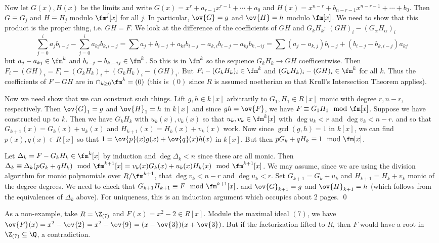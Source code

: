 Now let $G(x),H(x)$ be the limits and write $G(x)=x^r+a_{r-1}x^{r-1}+\cdots+a_0$ and $H(x)=x^{n-r}+b_{n-r-1}x^{n-r-1}+\cdots+b_0$. Then $G \equiv G_j$ and $H \equiv H_j$ modulo $\fm^j[x]$ for all $j$. In particular, $\ov{G}=g$ and $\ov{H}=h$ modulo $\fm[x]$. We need to show that this product is the proper thing, i.e. $GH=F$. We look at the difference of the coefficients of $GH$ and $G_kH_k$: $(GH)_i-(G_\alpha H_\alpha)_i$
\[
\sum_{j=0}^i a_jb_{i-j} - \sum_{j=0}^i a_{kj} b_{k,i-j}= \sum a_j+b_{i-j}+a_{ki}b_{i-j}-a_{k,i}b_{i-j}-a_{kj}b_{k,-ij}=\sum (a_j-a_{k,j})b_{i-j} + (b_{i-j}-b_{k,i-j})a_{kj} 
\]
but $a_j-a_{kj} \in \fm^k$ and $b_{i-j}-b_{k,-ij} \in \fm^k$. So this is in $\fm^k$ so the sequence $G_kH_k \to GH$ coefficentwise. Then $F_i-(GH)_i=F_i-(G_kH_k)_i+(G_kH_k)_i-(GH)_i$. But $F_i-(G_kH_k)_i \in \fm^k$ and $(G_kH_k)_i-(GH)_i \in \fm^k$ for all $k$. Thus the coefficients of $F-GH$ are in $\cap_{k \geq 0} \fm^k=(0)$ (this is $(0)$ since $R$ is assumed noetherian so that Krull's Intersection Theorem applies). 

Now we need show that we can construct such things. Lift $g,h \in k[x]$ arbitrarily to $G_1,H_1 \in R[x]$ monic with degree $r,n-r$, respectively. Then $\ov{G}_1=g$ and $\ov{H}_1=h$ in $k[x]$ and since $gh=\ov{F}$, we have $F \equiv G_1H_1 \mod \fm[x]$. Suppose we have constructed up to $k$. Then we have $G_kH_k$ with $u_k(x),v_k(x)$ so that $u_k,v_k \in \fm^k[x]$ with $\deg u_k<r$ and $\deg v_k<n-r$. and so that $G_{k+1}(x)=G_k(x)+u_k(x)$ and $H_{k+1}(x)=H_k(x)+v_k(x)$ work. Now since $\gcd(g,h)=1$ in $k[x]$, we can find $p(x),q(x) \in R[x]$ so that $1=\ov{p}(x)g(x)+\ov{q}(x)h(x)$ in $k[x]$. But then $pG_k+qH_k \equiv 1 \mod \fm[x]$. 

Let $\Delta_k=F-G_kH_k \in \fm^k[x]$ by induction and $\deg \Delta_k <n$ since these are all monic. Then $\Delta_k \equiv \Delta_k(pG_k+qH_k) \mod \fm^{k+1}[x]=v_k(x)G_k(x)+u_k(x)H_k(x) \mod \fm^{k+1}[x]$. We may assume, since we are using the division algorithm for monic polynomials over $R/\fm^{k+1}$, that $\deg v_k<n-r$ and $\deg u_k<r$. Set $G_{k+1}=G_k+u_k$ and $H_{k+1}=H_k+v_k$ monic of the degree degrees. We need to check that $G_{k+1}H_{k+1} \equiv F \mod \fm^{k+1}[x]$. and $\ov{G}_{k+1}=g$ and $\ov{H}_{k+1}=h$ (which follows from the equivalences of $\Delta_k$ above). For uniqueness, this is an induction argument which occupies about 2 pages. \qed \\

\begin{ex}
As a non-example, take $R=\Z_{(7)}$ and $F(x)=x^2-2 \in R[x]$. Module the maximal ideal $(7)$, we have $\ov{F}(x)=x^2-\ov{2}=x^2-\ov{9}=(x-\ov{3})(x+\ov{3})$. But if the factorization lifted to $R$, then $F$ would have a root in $\Z_{(7)} \subseteq \Q$, a contradiction. 
\end{ex}

